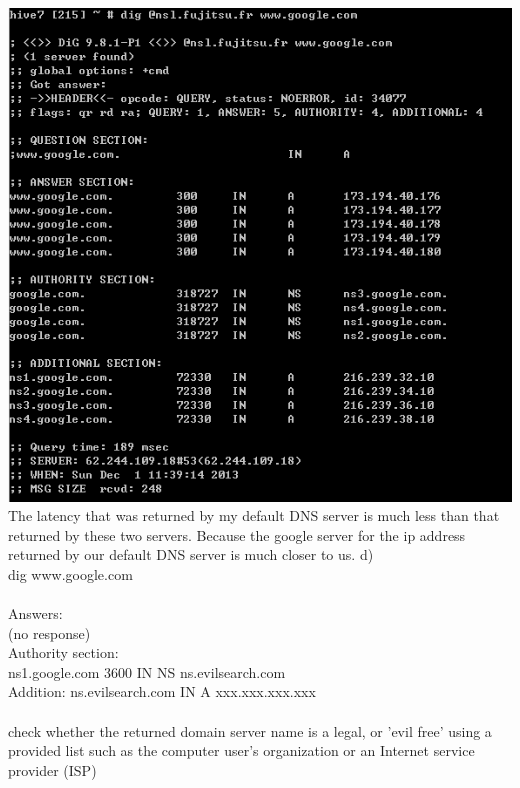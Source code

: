 \documentclass[11pt]{article}
\begin{document}
\includegraphics[scale=0.5]{122-hw3-6}\\
The latency that was returned by my default DNS server is much less than that returned by these two servers. Because the google server for the ip address returned by our default DNS server is much closer to us.
\newpage
d)\\
dig www.google.com\\
\\
Answers:\\
(no response)\\
Authority section:\\
ns1.google.com 3600 IN NS ns.evilsearch.com\\
Addition:
ns.evilsearch.com IN A xxx.xxx.xxx.xxx\\
\\
check whether the returned domain server name is a legal, or 'evil free' using a provided list such as the computer user's organization or an Internet service provider (ISP)
\label{pg:end-of-p1}




%
\newpage
\end{document}

